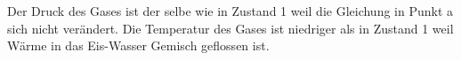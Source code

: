 Der Druck des Gases ist der selbe wie in Zustand 1 weil die Gleichung in Punkt a sich nicht verändert.  
Die Temperatur des Gases ist niedriger als in Zustand 1 weil Wärme in das Eis-Wasser Gemisch geflossen ist.